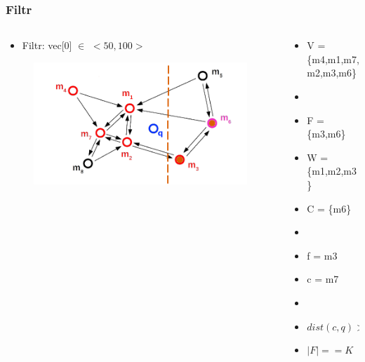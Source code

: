 \documentclass{beamer}
\begin{document}
	\begin{frame}
		\frametitle{Filtr}
		\begin{columns}[T] %
			
			\begin{column}{.6\textwidth}
				
				\begin{itemize}
					\item[] Filtr: vec[0] $\in$ $<50,100>$
				\end{itemize}
				
				\begin{figure}
					\includegraphics[scale=0.3]{figures/Filtry_b2.png}
				\end{figure}
			\end{column}%
			\hfill%
			\begin{column}{.4\textwidth}
				\begin{itemize}
					\item V = \{m4,m1,m7,m2,m3,m6\}
					\item[]
					\item F = \{m3,m6\}
					\item W = \{m1,m2,m3\}
					\item C = \{m6\}
					\item[]
					\item f = m3
					\item c = m7
					\item[]
					\item $dist(c,q) > dist(f,q)$
					\item $|F| == K$
				\end{itemize}
			\end{column}%
		\end{columns}
	\end{frame}
\end{document}
